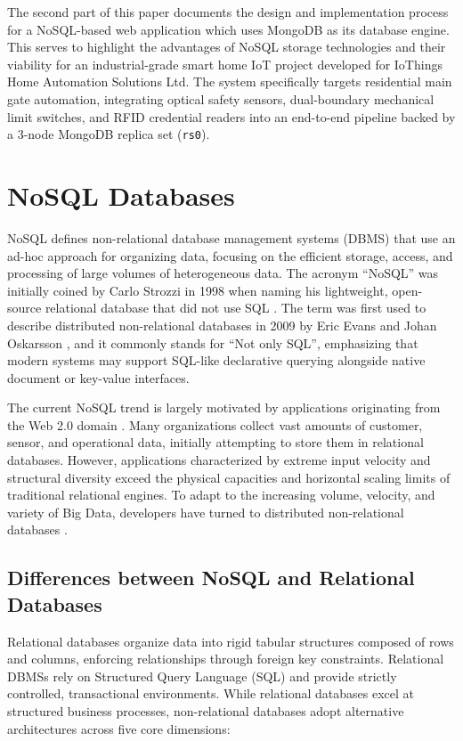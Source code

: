 \documentclass[11pt,a4paper]{article}
\begin{document}
The second part of this paper documents the design and implementation process for a NoSQL-based web application which uses MongoDB as its database engine. This serves to highlight the advantages of NoSQL storage technologies and their viability for an industrial-grade smart home IoT project developed for IoThings Home Automation Solutions Ltd. The system specifically targets residential main gate automation, integrating optical safety sensors, dual-boundary mechanical limit switches, and RFID credential readers into an end-to-end pipeline backed by a 3-node MongoDB replica set (\texttt{rs0}).

\section{NoSQL Databases}

NoSQL defines non-relational database management systems (DBMS) that use an ad-hoc approach for organizing data, focusing on the efficient storage, access, and processing of large volumes of heterogeneous data. The acronym ``NoSQL'' was initially coined by Carlo Strozzi in 1998 when naming his lightweight, open-source relational database that did not use SQL \citep{ayers1998}. The term was first used to describe distributed non-relational databases in 2009 by Eric Evans and Johan Oskarsson \citep{foote2018}, and it commonly stands for ``Not only SQL'', emphasizing that modern systems may support SQL-like declarative querying alongside native document or key-value interfaces.

The current NoSQL trend is largely motivated by applications originating from the Web 2.0 domain \citep{oreilly2009}. Many organizations collect vast amounts of customer, sensor, and operational data, initially attempting to store them in relational databases. However, applications characterized by extreme input velocity and structural diversity exceed the physical capacities and horizontal scaling limits of traditional relational engines. To adapt to the increasing volume, velocity, and variety of Big Data, developers have turned to distributed non-relational databases \citep{leavitt2010}.

\subsection{Differences between NoSQL and Relational Databases}
Relational databases organize data into rigid tabular structures composed of rows and columns, enforcing relationships through foreign key constraints. Relational DBMSs rely on Structured Query Language (SQL) and provide strictly controlled, transactional environments. While relational databases excel at structured business processes, non-relational databases adopt alternative architectures across five core dimensions:
\end{document}
